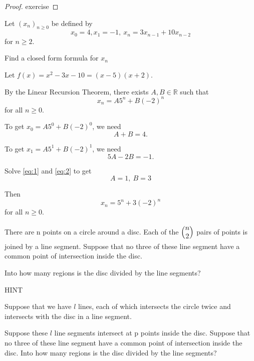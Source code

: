\begin{proof}
    exercise
\end{proof}

\begin{exmp}
Let $(x_n)_{n\geq 0}$ be defined by \[x_0 = 4,x_1 = -1, \ x_n = 3x_{n-1}+10x_{n-2}\]
for $n\geq 2$.

Find a closed form formula for $x_n$
\end{exmp}

\begin{solution}
Let $f(x) = x^2 -3x - 10 = (x-5)(x+2)$.

By the Linear Recursion Theorem, there exists $A,B\in \mathbb{R}$ such that \[x_n = A5^n + B(-2)^n\] for all $n\geq 0.$

To get $x_0 = A5^0+B(-2)^0$, we need
\begin{equation}\label{eq:1}
A+B=4.
\end{equation}

To get $x_1 = A5^1+B(-2)^1$, we need 
\begin{equation}\label{eq:2}
5A-2B = -1.
\end{equation}

Solve \ref{eq:1} and \ref{eq:2} to get \[A=1, \ B = 3\]

Then \[x_n = 5^n + 3(-2)^n\] for all $n\geq 0$.
\end{solution}


\begin{exmp}
There are n points on a circle around a disc. Each of the $\mybinom{n}{2}$ pairs of points is joined by a line segment. Suppose that no three of these line segment have a common point of intersection inside the disc.

Into how many regions is the disc divided by the line segments?
\end{exmp}
\begin{solution}
HINT

Suppose that we have $l$ lines, each of which intersects the circle twice and intersects with the disc in a line segment.

Suppose these $l$ line segments intersect at p points inside the disc. Suppose that no three of these line segment have a common point of intersection inside the disc. Into how many regions is the disc divided by the line segments?
\end{solution}
